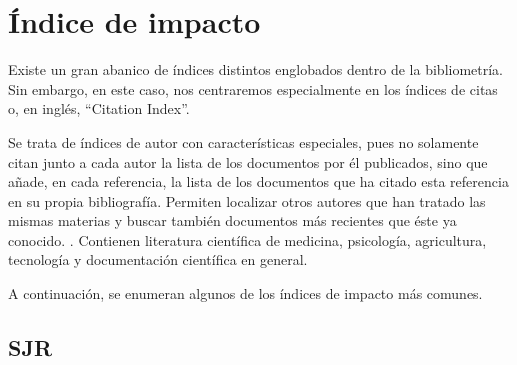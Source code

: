  
\section{Índice de impacto}

Existe un gran abanico de índices distintos englobados dentro de la bibliometría. Sin embargo, en este caso, nos centraremos especialmente en los índices de citas o, en inglés, ``Citation Index''.

Se trata de índices de autor con características especiales, pues no solamente citan junto a cada autor la lista de los documentos por él publicados, sino que añade, en cada referencia, la lista de los documentos que ha citado esta referencia en su propia bibliografía. Permiten localizar otros autores que han tratado las mismas materias y buscar también documentos más recientes que éste ya conocido. \cite{Amat1989}. Contienen literatura científica de medicina, psicología, agricultura, tecnología y documentación científica en general. 

A continuación, se enumeran algunos de los índices de impacto más comunes.









\subsection{SJR}

